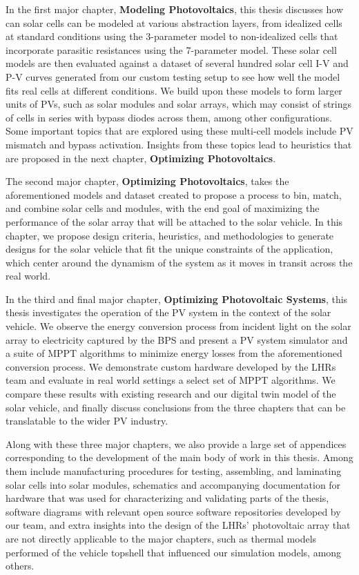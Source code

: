 In the first major chapter, \textbf{Modeling Photovoltaics}, this thesis
discusses how can solar cells can be modeled at various abstraction layers, from
idealized cells at standard conditions using the 3-parameter model to
non-idealized cells that incorporate parasitic resistances using the 7-parameter
model. These solar cell models are then evaluated against a dataset of several
hundred solar cell \ac{I-V} and \ac{P-V} curves generated from our custom
testing setup to see how well the model fits real cells at different conditions.
We build upon these models to form larger units of \ac{PV}s, such as solar
modules and solar arrays, which may consist of strings of cells in series with
bypass diodes across them, among other configurations. Some important topics
that are explored using these multi-cell models include \ac{PV} mismatch and
bypass activation. Insights from these topics lead to heuristics that are
proposed in the next chapter, \textbf{Optimizing Photovoltaics}.

The second major chapter, \textbf{Optimizing Photovoltaics}, takes the
aforementioned models and dataset created to propose a process to bin, match,
and combine solar cells and modules, with the end goal of maximizing the
performance of the solar array that will be attached to the solar vehicle. In
this chapter, we propose design criteria, heuristics, and methodologies to
generate designs for the solar vehicle that fit the unique constraints of the
application, which center around the dynamism of the system as it moves in
transit across the real world.

In the third and final major chapter, \textbf{Optimizing Photovoltaic
Systems}, this thesis investigates the operation of the \ac{PV}
system in the context of the solar vehicle. We observe the energy conversion
process from incident light on the solar array to electricity captured by the
\ac{BPS} and present a \ac{PV} system simulator and a suite of \ac{MPPT}
algorithms to minimize energy losses from the aforementioned conversion process.
We demonstrate custom hardware developed by the \ac{LHRs} team and evaluate in
real world settings a select set of \ac{MPPT} algorithms. We compare these
results with existing research and our digital twin model of the solar vehicle,
and finally discuss conclusions from the three chapters that can be translatable
to the wider \ac{PV} industry.

Along with these three major chapters, we also provide a large set of appendices
corresponding to the development of the main body of work in this thesis. Among
them include manufacturing procedures for testing, assembling, and laminating
solar cells into solar modules, schematics and accompanying documentation for
hardware that was used for characterizing and validating parts of the thesis,
software diagrams with relevant open source software repositories developed by
our team, and extra insights into the design of the \ac{LHRs}' photovoltaic
array that are not directly applicable to the major chapters, such as thermal
models performed of the vehicle topshell that influenced our simulation models,
among others.
